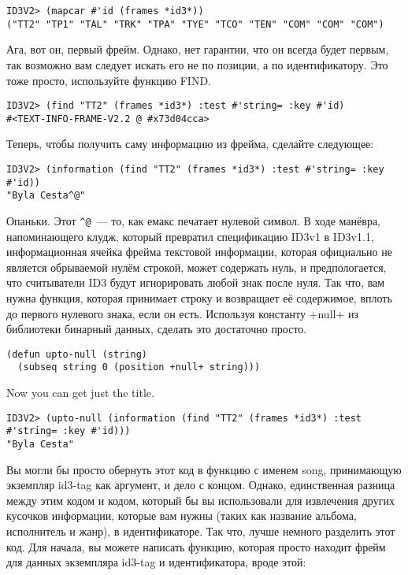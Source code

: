 \begin{lstlisting}
ID3V2> (mapcar #'id (frames *id3*))
("TT2" "TP1" "TAL" "TRK" "TPA" "TYE" "TCO" "TEN" "COM" "COM" "COM")
\end{lstlisting}

Ага, вот он, первый фрейм. Однако, нет гарантии, что он всегда будет первым, так возможно
вам следует искать его не по позиции, а по идентификатору. Это тоже просто, используйте
функцию FIND.

\begin{lstlisting}
ID3V2> (find "TT2" (frames *id3*) :test #'string= :key #'id)
#<TEXT-INFO-FRAME-V2.2 @ #x73d04cca>
\end{lstlisting}

Теперь, чтобы получить саму информацию из фрейма, сделайте следующее:

\begin{lstlisting}
ID3V2> (information (find "TT2" (frames *id3*) :test #'string= :key #'id))
"Byla Cesta^@"
\end{lstlisting}

Опаньки. Этот \lstinline!^@!~--- то, как емакс печатает нулевой символ. В ходе манёвра,
напоминающего клудж, который превратил спецификацию ID3v1 в ID3v1.1, информационная ячейка
фрейма текстовой информации, которая официально не является обрываемой нулём строкой,
может содержать нуль, и предпологается, что считыватели ID3 будут игнорировать любой знак
после нуля. Так что, вам нужна функция, которая принимает строку и возвращает её
содержимое, вплоть до первого нулевого знака, если он есть. Используя константу +null+ из
библиотеки бинарный данных, сделать это достаточно просто.

\begin{lstlisting}
(defun upto-null (string)
  (subseq string 0 (position +null+ string)))
\end{lstlisting}

Now you can get just the title.

\begin{lstlisting}
ID3V2> (upto-null (information (find "TT2" (frames *id3*) :test #'string= :key #'id)))
"Byla Cesta"
\end{lstlisting}

Вы могли бы просто обернуть этот код в функцию с именем song, принимающую экземпляр
id3-tag как аргумент, и дело с концом. Однако, единственная разница между этим кодом и
кодом, который бы вы использовали для извлечения других кусочков информации, которые вам
нужны (таких как название альбома, исполнитель и жанр), в идентификаторе. Так что, лучше
немного разделить этот код. Для начала, вы можете написать функцию, которая просто находит
фрейм для данных экземпляра id3-tag и идентификатора, вроде этой:

